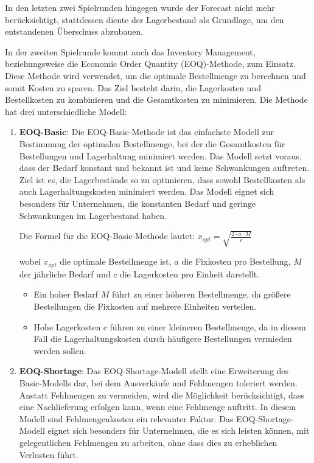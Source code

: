\documentclass[a4paper,12pt]{article}
\begin{document}
In den letzten zwei Spielrunden hingegen wurde der Forecast nicht mehr berücksichtigt, stattdessen diente der Lagerbestand als Grundlage, um den entstandenen Überschuss abzubauen.

In der zweiten Spielrunde kommt auch das Inventory Management,
beziehungsweise die Economic Order Quantity (EOQ)-Methode, zum Einsatz.
Diese Methode wird verwendet, um die optimale Bestellmenge zu berechnen und somit Kosten zu sparen.
Das Ziel besteht darin, die Lagerkosten und Bestellkosten zu kombinieren und die Gesamtkosten zu minimieren.
Die Methode hat drei unterschiedliche Modell:
\begin{enumerate}
    \item \textbf{EOQ-Basic}:\newline
    Die EOQ-Basic-Methode ist das einfachste Modell zur Bestimmung der optimalen Bestellmenge,
    bei der die Gesamtkosten für Bestellungen und Lagerhaltung minimiert werden. Das Modell setzt voraus,
    dass der Bedarf konstant und bekannt ist und keine Schwankungen auftreten. Ziel ist es, die Lagerbestände so zu optimieren,
    dass sowohl Bestellkosten als auch Lagerhaltungskosten minimiert werden. 
    Das Modell eignet sich besonders für Unternehmen, die konstanten Bedarf und geringe Schwankungen im Lagerbestand haben.
    
    Die Formel für die EOQ-Basic-Methode lautet: 
    $x_{opt} = \sqrt{\frac{2 \cdot a \cdot M}{c}}$ 

    wobei $x_{opt}$ die optimale Bestellmenge ist, $a$ die Fixkosten pro Bestellung, $M$ der jährliche Bedarf und $c$ die Lagerkosten pro Einheit darstellt. 
    \begin{itemize}
        \item Ein hoher Bedarf $M$ führt zu einer höheren Bestellmenge, da größere Bestellungen die Fixkosten auf mehrere Einheiten verteilen.
        \item Hohe Lagerkosten $c$ führen zu einer kleineren Bestellmenge, da in diesem Fall die Lagerhaltungskosten durch häufigere Bestellungen vermieden werden sollen.
    \end{itemize}
    
    
    \item \textbf{EOQ-Shortage}:\newline
    Das EOQ-Shortage-Modell stellt eine Erweiterung des Basic-Modells dar, bei dem Ausverkäufe und Fehlmengen toleriert werden.
    Anstatt Fehlmengen zu vermeiden, wird die Möglichkeit berücksichtigt, dass eine Nachlieferung erfolgen kann, wenn eine Fehlmenge auftritt.
    In diesem Modell sind Fehlmengenkosten ein relevanter Faktor.
    Das EOQ-Shortage-Modell eignet sich besonders für Unternehmen, die es sich leisten können,
    mit gelegentlichen Fehlmengen zu arbeiten, ohne dass dies zu erheblichen Verlusten führt.


\end{enumerate}
\end{document}
